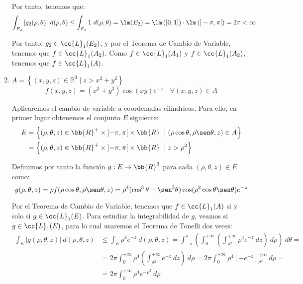 \begin{ejercicio}
\begin{enumerate}
        Por tanto, tenemos que:
        \begin{align*}
            \int_{E_2} |g_2(\rho, \theta)|~d(\rho, \theta)
            &\leq \int_{E_2} 1~d(\rho, \theta)
            = \lm(E_2) = \lm\left(\left]0,1\right]\right) \cdot \lm\left(]-\pi, \pi[\right) = 2\pi < \infty
        \end{align*}

        Por tanto, $g_2\in \cc{L}_1(E_2)$, y por el Teorema de Cambio de Variable, tenemos que $f\in \cc{L}_1(A_2)$.
        Como $f\in \cc{L}_1(A_1)$ y $f\in \cc{L}_1(A_2)$, tenemos que $f\in \cc{L}_1(A)$.

        \item \( A = \left\{ (x, y, z) \in \mathbb{R}^3 \mid z > x^2 + y^2 \right\} \)
        \[ f(x, y, z) = (x^3 + y^3) \cos (xy) e^{-z} \quad \forall (x, y, z) \in A \]

        Aplicaremos el cambio de variable a coordenadas cilíndricas. Para ello, en primer
        lugar obtenemos el conjunto $E$ siguiente:
        \begin{align*}
            E &= \left\{ (\rho, \theta, z) \in \bb{R}^+\times \left]-\pi, \pi\right[ \times \bb{R} ~\mid (\rho\cos\theta, \rho\sen\theta, z) \in A \right\} \\
            &= \left\{ (\rho, \theta, z) \in \bb{R}^+\times \left]-\pi, \pi\right[ \times \bb{R} ~\mid z > \rho^2 \right\}
        \end{align*}

        Definimos por tanto la función $g: E \to \bb{R}^3$ para cada $(\rho, \theta, z) \in E$ como:
        \begin{equation*}
            g(\rho, \theta, z) = \rho f(\rho\cos\theta, \rho\sen\theta, z) = \rho^4(\cos^3\theta + \sen^3\theta) \cos(\rho^2\cos\theta\sen\theta)e^{-z}
        \end{equation*}

        Por el Teorema de Cambio de Variable, tenemos que $f\in \cc{L}_1(A)$ si y solo si $g\in \cc{L}_1(E)$. Para estudiar la integrabilidad de $g$, veamos si $g\in \cc{L}_1(E)$,
        para lo cual usaremos el Teorema de Tonelli dos veces:
        \begin{align*}
            \int_E |g(\rho, \theta, z)|~d(\rho, \theta, z)
            &\leq \int_E \rho^4e^{-z}~d(\rho, \theta, z)
            = \int_{-\pi}^\pi \left( \int_0^{+\infty} \left( \int_{\rho^2}^{+\infty} \rho^4e^{-z}~dz \right)~d\rho \right)~d\theta =\\
            &= 2\pi \int_0^{+\infty}\rho^4 \left( \int_{\rho^2}^{+\infty}e^{-z}~dz \right)~d\rho
            = 2\pi \int_0^{+\infty}\rho^4 \left[ -e^{-z} \right]_{\rho^2}^{+\infty}~d\rho =\\
            &= 2\pi \int_0^{+\infty}\rho^4e^{-\rho^2}~d\rho
        \end{align*}


\end{enumerate}
\end{ejercicio}
